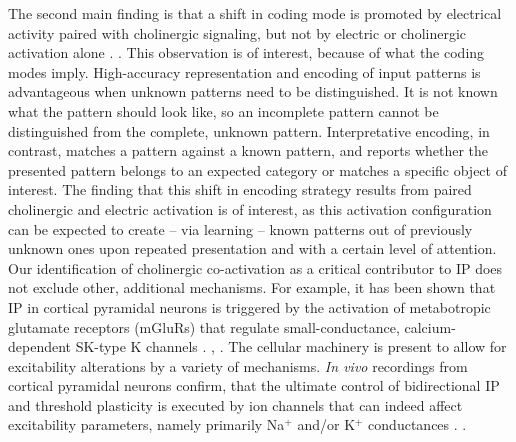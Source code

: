 The second main finding is that a shift in coding mode
        is promoted by electrical activity paired with cholinergic signaling,
        but not by electric or cholinergic activation alone
    .
    .
    This observation is of interest, because of what the coding modes imply.
    High-accuracy representation and encoding of input patterns is advantageous
        when unknown patterns need to be distinguished.
    It is not known what the pattern should look like,
        so an incomplete pattern cannot be distinguished from the complete, unknown pattern.
    Interpretative encoding, in contrast,
        matches a pattern against a known pattern,
        and reports whether
            the presented pattern belongs to an expected category
            or matches a specific object of interest.
    The finding that this shift in encoding strategy results
        from paired cholinergic and electric activation is of interest,
        as this activation configuration can be expected to create -- via learning --
        known patterns out of previously unknown ones
        upon repeated presentation and with a certain level of attention.
    Our identification of cholinergic co-activation as a critical contributor to IP
        does not exclude other, additional mechanisms.
    For example, it has been shown that IP in cortical pyramidal neurons
        is triggered by the activation of metabotropic glutamate receptors (mGluRs) that
            regulate small-conductance, calcium-dependent SK-type K channels \citep{Sourdet2003-qr}.
     \citep{Gill2020-wy},
                .
    The cellular machinery is present to allow for excitability alterations by a variety of mechanisms.
    \textit{In vivo} recordings from cortical pyramidal neurons confirm, that
        the ultimate control of bidirectional IP and threshold plasticity is executed by ion channels
            that can indeed affect excitability parameters,
            namely primarily Na$^+$ and/or K$^+$ conductances \citep{Mahon2012-bt}.
        .

